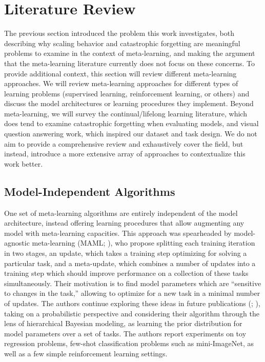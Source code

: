 \chapter{Literature Review\label{ch:literature-review}}
The previous section introduced the problem this work investigates, both describing why scaling behavior and catastrophic forgetting are meaningful problems to examine in the context of meta-learning, and making the argument that the meta-learning literature currently does not focus on these concerns. To provide additional context, this section will review different meta-learning approaches. We will review meta-learning approaches for different types of learning problems (supervised learning, reinforcement learning, or others) and discuss the model architectures or learning procedures they implement. Beyond meta-learning, we will survey the continual/lifelong learning literature, which does tend to examine catastrophic forgetting when evaluating models, and visual question answering work, which inspired our dataset and task design. We do not aim to provide a comprehensive review and exhaustively cover the field, but instead, introduce a more extensive array of approaches to contextualize this work better.

\section{Model-Independent Algorithms}
One set of meta-learning algorithms are entirely independent of the model architecture, instead offering learning procedures that allow augmenting any model with meta-learning capacities. This approach was spearheaded by model-agnostic meta-learning (MAML; \cite{Finn2017}), who propose splitting each training iteration in two stages, an update, which takes a training step optimizing for solving a particular task, and a meta-update, which combines a number of updates into a training step which should improve performance on a collection of these tasks simultaneously. Their motivation is to find model parameters which are “sensitive to changes in the task,” allowing to optimize for a new task in a minimal number of updates. The authors continue exploring these ideas in future publications (\cite{Finn2018a}; \cite{Grant2018}), taking on a probabilistic perspective and considering their algorithm through the lens of hierarchical Bayesian modeling, as learning the prior distribution for model parameters over a set of tasks. The authors report experiments on toy regression problems, few-shot classification problems such as mini-ImageNet, as well as a few simple reinforcement learning settings.
 

